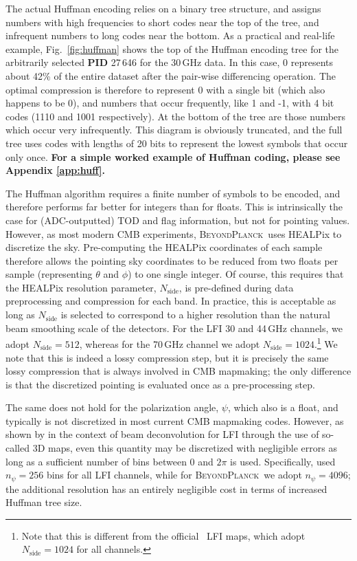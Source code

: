 \documentclass[twocolumn]{aa}
\newcommand{\BP}{\textsc{BeyondPlanck}}
\begin{document}
The actual Huffman encoding relies on a binary tree structure, and
assigns numbers with high frequencies to short codes near the top of
the tree, and infrequent numbers to long codes near the bottom.  As a
practical and real-life example, Fig.~\ref{fig:huffman} shows the top
of the Huffman encoding tree for the arbitrarily selected \textbf{PID} 27\,646 for the 30\,GHz data. In this case, 0 represents
about 42\% of the entire dataset after the pair-wise differencing
operation. The optimal compression is therefore to represent 0 with a
single bit (which also happens to be 0), and numbers that occur
frequently, like 1 and -1, with 4 bit codes (1110 and 1001
respectively). At the bottom of the tree are those numbers which occur
very infrequently. This diagram is obviously truncated, and the full
tree uses codes with lengths of 20 bits to represent the lowest
symbols that occur only once. \textbf{For a simple worked example of Huffman coding, please see Appendix \ref{app:huff}.}

The Huffman algorithm requires a finite number of symbols to be
encoded, and therefore performs far better for integers than for
floats. This is intrinsically the case for (ADC-outputted) TOD and
flag information, but not for pointing values. However, as most modern
CMB experiments, \BP\ uses HEALPix to discretize the
sky. Pre-computing the HEALPix coordinates of each sample therefore
allows the pointing sky coordinates to be reduced from two floats per
sample (representing $\theta$ and $\phi$) to one single integer. Of
course, this requires that the HEALPix resolution parameter,
$N_{\mathrm{side}}$, is pre-defined during data preprocessing and
compression for each band. In practice, this is acceptable as long as
$N_{\mathrm{side}}$ is selected to correspond to a higher resolution
than the natural beam smoothing scale of the detectors. For the LFI 30
and 44\,GHz channels, we adopt $N_{\mathrm{side}}=512$, whereas for
the 70\,GHz channel we adopt $N_{\mathrm{side}}=1024$.\footnote{Note
  that this is different from the official \Planck\ LFI maps, which
  adopt $N_{\mathrm{side}}=1024$ for all channels.} We note that this
is indeed a lossy compression step, but it is precisely the same lossy
compression that is always involved in CMB mapmaking; the only
difference is that the discretized pointing is evaluated once as a
pre-processing step.


The same does not hold for the polarization angle, $\psi$, which also
is a float, and typically is not discretized in most current CMB
mapmaking codes. However, as shown by \citet{keihanen2012} in the
context of beam deconvolution for LFI through the use of so-called 3D
maps, even this quantity may be discretized with negligible errors as
long as a sufficient number of bins between 0 and $2\pi$ is
used. Specifically, \citet{keihanen2012} used $n_{\psi}=256$ bins for
all LFI channels, while for \BP\ we adopt $n_{\psi}=4096$; the
additional resolution has an entirely negligible cost in terms of
increased Huffman tree size.
\end{document}

